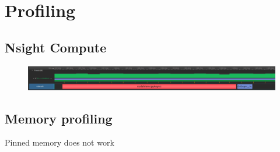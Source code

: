 \section{Profiling}

\subsection{Nsight Compute}
\begin{figure}[H]
    \centering
    \includegraphics[width=\textwidth]{figures/memory_comparaison.png}
\end{figure}

\subsection{Memory profiling}
Pinned memory does not work